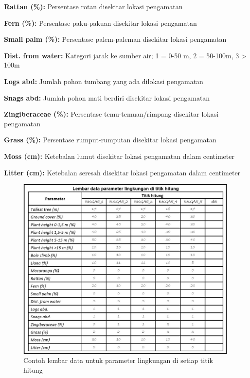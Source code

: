 \documentclass[
  oneside]{book}
\begin{document}
\textbf{Rattan (\%):} Persentase rotan disekitar lokasi pengamatan

\textbf{Fern (\%):} Persentase paku-pakuan disekitar lokasi pengamatan

\textbf{Small palm (\%):} Persentase palem-paleman disekitar lokasi pengamatan

\textbf{Dist. from water:} Kategori jarak ke sumber air; 1 = 0-50 m, 2 = 50-100m, 3 \textgreater{} 100m

\textbf{Logs abd:} Jumlah pohon tumbang yang ada dilokasi pengamatan

\textbf{Snags abd:} Jumlah pohon mati berdiri disekitar lokasi pengamatan

\textbf{Zingiberaceae (\%):} Persentase temu-temuan/rimpang disekitar lokasi pengamatan

\textbf{Grass (\%):} Persentase rumput-rumputan disekitar lokasi pengamatan

\textbf{Moss (cm):} Ketebalan lumut disekitar lokasi pengamatan dalam centimeter

\textbf{Litter (cm):} Ketebalan seresah disekitar lokasi pengamatan dalam centimeter

\begin{figure}

{\centering \includegraphics[width=1\linewidth]{images/ldp_pl} 

}

\caption{Contoh lembar data untuk parameter lingkungan di setiap titik hitung}\label{fig:ldppl}
\end{figure}
\end{document}
